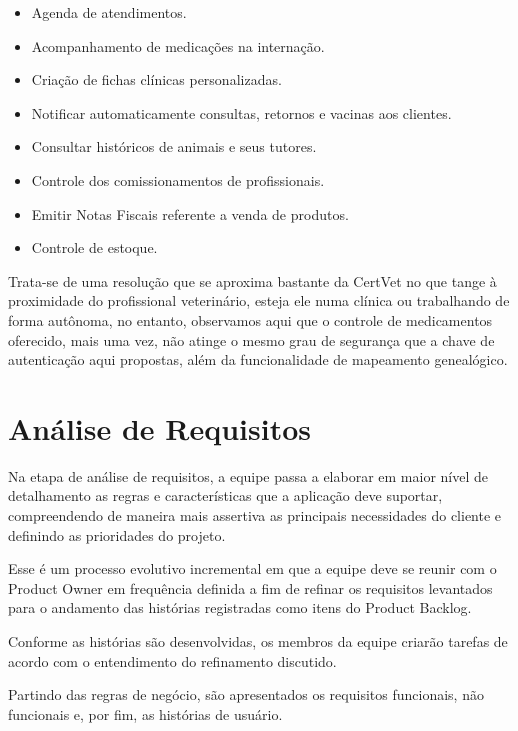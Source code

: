\documentclass[
    12pt,               %
    openright,          %
    oneside,
    a4paper,            %
    BIBLATEX,           %
    TODO,               %
    english,            %
    brazil              %
    ]{ifsp-spo-inf-ctds}
\begin{document}
\begin{itemize}
    \item Agenda de atendimentos.
    \item Acompanhamento de medicações na internação.
    \item Criação de fichas clínicas personalizadas.
    \item Notificar automaticamente consultas, retornos e vacinas aos clientes.
    \item Consultar históricos de animais e seus tutores.
    \item Controle dos comissionamentos de profissionais.
    \item Emitir Notas Fiscais referente a venda de produtos.
    \item Controle de estoque.
\end{itemize}

Trata-se de uma resolução que se aproxima bastante da CertVet no que tange à proximidade do profissional veterinário, esteja ele numa clínica ou trabalhando de forma autônoma, no entanto, observamos aqui que o controle de medicamentos oferecido, mais uma vez, não atinge o mesmo grau de segurança que a chave de autenticação aqui propostas, além da funcionalidade de mapeamento genealógico.


\postextual

    \section{Análise de Requisitos}
    
        Na etapa de análise de requisitos, a equipe passa a elaborar em maior nível de detalhamento as regras e características que a aplicação deve suportar, compreendendo de maneira mais assertiva as principais necessidades do cliente e definindo as prioridades do projeto.
        
        Esse é um processo evolutivo incremental em que a equipe deve se reunir com o Product Owner em frequência definida a fim de refinar os requisitos levantados para o andamento das histórias registradas como itens do Product Backlog. 
        
        Conforme as histórias são desenvolvidas, os membros da equipe criarão tarefas de acordo com o entendimento do refinamento discutido.
        
        Partindo das regras de negócio, são apresentados os requisitos funcionais, não funcionais e, por fim, as histórias de usuário.
\end{document}
